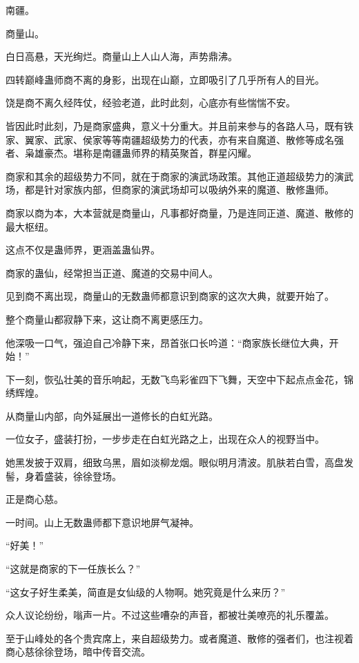 
\begin{this_body}

南疆。

商量山。

白日高悬，天光绚烂。商量山上人山人海，声势鼎沸。

四转巅峰蛊师商不离的身影，出现在山巅，立即吸引了几乎所有人的目光。

饶是商不离久经阵仗，经验老道，此时此刻，心底亦有些惴惴不安。

皆因此时此刻，乃是商家盛典，意义十分重大。并且前来参与的各路人马，既有铁家、翼家、武家、侯家等等南疆超级势力的代表，亦有来自魔道、散修等成名强者、枭雄豪杰。堪称是南疆蛊师界的精英聚首，群星闪耀。

商家和其余的超级势力不同，就在于商家的演武场政策。其他正道超级势力的演武场，都是针对家族内部，但商家的演武场却可以吸纳外来的魔道、散修蛊师。

商家以商为本，大本营就是商量山，凡事都好商量，乃是连同正道、魔道、散修的最大枢纽。

这点不仅是蛊师界，更涵盖蛊仙界。

商家的蛊仙，经常担当正道、魔道的交易中间人。

见到商不离出现，商量山的无数蛊师都意识到商家的这次大典，就要开始了。

整个商量山都寂静下来，这让商不离更感压力。

他深吸一口气，强迫自己冷静下来，昂首张口长吟道：“商家族长继位大典，开始！”

下一刻，恢弘壮美的音乐响起，无数飞鸟彩雀四下飞舞，天空中下起点点金花，锦绣辉煌。

从商量山内部，向外延展出一道修长的白虹光路。

一位女子，盛装打扮，一步步走在白虹光路之上，出现在众人的视野当中。

她黑发披于双肩，细致乌黑，眉如淡柳龙烟。眼似明月清波。肌肤若白雪，高盘发髻，身着盛装，徐徐登场。

正是商心慈。

一时间。山上无数蛊师都下意识地屏气凝神。

“好美！”

“这就是商家的下一任族长么？”

“这女子好生柔美，简直是女仙级的人物啊。她究竟是什么来历？”

众人议论纷纷，嗡声一片。不过这些嘈杂的声音，都被壮美嘹亮的礼乐覆盖。

至于山峰处的各个贵宾席上，来自超级势力。或者魔道、散修的强者们，也注视着商心慈徐徐登场，暗中传音交流。


\end{this_body}
